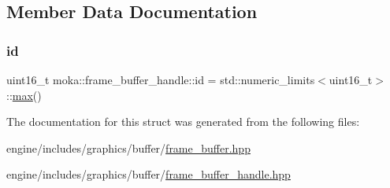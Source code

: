 \subsection{Member Data Documentation}
\mbox{\label{structmoka_1_1frame__buffer__handle_acb7144f84b9cf5ac4b0eb6af3aea0e27}} 
\subsubsection{\texorpdfstring{id}{id}}
{\footnotesize\ttfamily uint16\+\_\+t moka\+::frame\+\_\+buffer\+\_\+handle\+::id = std\+::numeric\+\_\+limits$<$uint16\+\_\+t$>$\+::\mbox{\hyperlink{namespacemoka_acf03408f89c521244763fb5f8746ce16a2ffe4e77325d9a7152f7086ea7aa5114}{max}}()}



The documentation for this struct was generated from the following files\+:\begin{DoxyCompactItemize}
\item 
engine/includes/graphics/buffer/\mbox{\hyperlink{frame__buffer_8hpp}{frame\+\_\+buffer.\+hpp}}\item 
engine/includes/graphics/buffer/\mbox{\hyperlink{frame__buffer__handle_8hpp}{frame\+\_\+buffer\+\_\+handle.\+hpp}}\end{DoxyCompactItemize}
